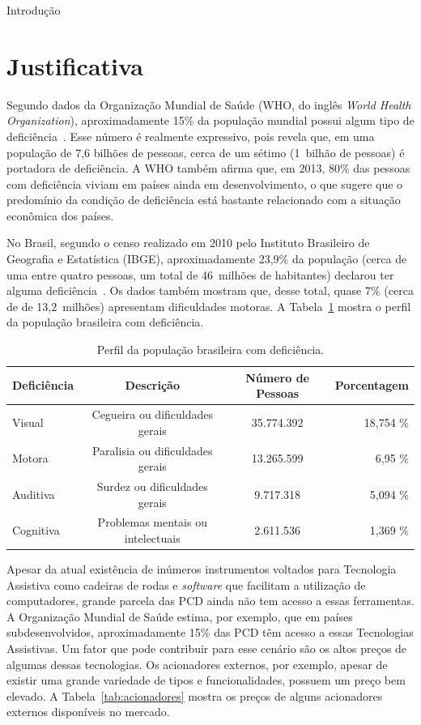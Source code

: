 \begin{chapter}{Introdução}
\section{Justificativa}

Segundo dados da Organização Mundial de Saúde (WHO, do inglês \textit{World
Health Organization}), aproximadamente 15\% da população mundial possui algum
tipo de deficiência~\cite{WHO15}. Esse número é realmente expressivo, pois
revela que, em uma população de 7,6 bilhões de pessoas, cerca de um sétimo
(1~bilhão de pessoas) é portadora de deficiência. A WHO também afirma que, em
2013, 80\% das pessoas com deficiência viviam em países ainda em
desenvolvimento, o que sugere que o predomínio da condição de deficiência está
bastante relacionado com a situação econômica dos países.

No Brasil, segundo o censo realizado em 2010 pelo Instituto Brasileiro de
Geografia e Estatística (IBGE), aproximadamente 23,9\% da população (cerca de
uma entre quatro pessoas, um total de 46~milhões de habitantes) declarou ter
alguma deficiência~\cite{tIBGE}. Os dados também mostram que, desse total, quase
7\% (cerca de de 13,2~milhões) apresentam dificuldades motoras. A
Tabela~\ref{tab:ibge} mostra o perfil da população brasileira com deficiência.

\begin{table}[!h]
\centering
\caption{Perfil da população brasileira com deficiência.}
\label{tab:ibge}
\def\arraystretch{1.25}
\begin{tabular}{lccr}
	\hline
	\hline
	\textbf{Deficiência} & \textbf{Descrição} & \textbf{Número de Pessoas} &
\textbf{Porcentagem} \\
	\hline
	Visual    & Cegueira ou dificuldades gerais   & 35.774.392  & 18,754 \%  \\
	Motora    & Paralisia ou dificuldades gerais  & 13.265.599  & 6,95 \% \\
	Auditiva  & Surdez ou dificuldades gerais     & 9.717.318   &  5,094 \%  \\
	Cognitiva & Problemas mentais ou intelectuais & 2.611.536   &  1,369 \%  \\ 
	\hline
	\hline
\end{tabular}
\end{table}

Apesar da atual existência de inúmeros instrumentos voltados para Tecnologia
Assistiva como cadeiras de rodas e \textit{software} que facilitam a utilização
de computadores, grande parcela das PCD ainda não tem acesso a essas
ferramentas. A Organização Mundial de Saúde estima, por exemplo, que em países
subdesenvolvidos, aproximadamente 15\% das PCD têm acesso a essas Tecnologias
Assistivas\cite{WHO15}. Um fator que pode contribuir para esse cenário são os altos preços
de algumas dessas tecnologias. Os acionadores externos, por exemplo, apesar de
existir uma grande variedade de tipos e funcionalidades, possuem um preço bem
elevado. A Tabela~\ref{tab:acionadores} mostra os preços de alguns acionadores externos
disponíveis no mercado.


\end{chapter}
